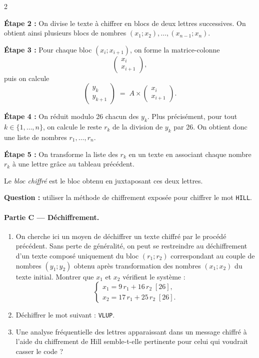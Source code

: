 \documentclass[a4paper,12pt]{article}
\begin{document}
\begin{multicols}{2}
\begin{exercice}[title=Exercice 18 $\star\star\star$ { [Modéliser, Calculer, Chercher] }]{}{}
  \textbf{Étape 2 :} On divise le texte à chiffrer en blocs de deux lettres successives.
  On obtient ainsi plusieurs blocs de nombres $(x_1;x_2),\dots,(x_{n-1};x_n)$.

  \newcolumn
  \textbf{Étape 3 :} Pour chaque bloc $(x_i; x_{i+1})$, on forme la matrice-colonne
  \[
    \begin{pmatrix} x_i \\[4pt] x_{i+1}
    \end{pmatrix},
  \]
  puis on calcule
  \[
    \begin{pmatrix} y_k \\[4pt] y_{k+1}
    \end{pmatrix}
    \;=\;
    A \times
    \begin{pmatrix} x_i \\[3pt] x_{i+1}
    \end{pmatrix}.
  \]

  \textbf{Étape 4 :} On réduit modulo 26 chacun des $y_k$. Plus précisément, pour tout $k \in \{1,\ldots,n\}$, on calcule le reste $r_k$ de la division de $y_k$ par 26. On obtient donc une liste de nombres $r_1,\ldots,r_n$.

  \textbf{Étape 5 :} On transforme la liste des $r_k$ en un texte en associant chaque nombre $r_k$ à une lettre grâce au tableau précédent.

  Le \emph{bloc chiffré} est le bloc obtenu en juxtaposant ces deux lettres.

  \textbf{Question :} utiliser la méthode de chiffrement exposée pour chiffrer le mot \texttt{HILL}.

  \paragraph{Partie C — Déchiffrement.}
  \begin{enumerate}
    \item On cherche ici un moyen de déchiffrer un texte chiffré par le procédé précédent. Sans perte de généralité, on peut se restreindre au déchiffrement d’un texte composé uniquement du bloc $(r_1; r_2)$ correspondant au couple de nombres $(y_1; y_2)$ obtenu après transformation des nombres $(x_1; x_2)$ du texte initial. Montrer que $x_1$ et $x_2$ vérifient le système :
      \[
        \begin{cases}
          x_1 = 9\,r_1 + 16\,r_2 \;[26], \\
          x_2 = 17\,r_1 + 25\,r_2 \;[26].
        \end{cases}
      \]
    \item Déchiffrer le mot suivant : \texttt{VLUP}.
    \item Une analyse fréquentielle des lettres apparaissant dans un message chiffré à l’aide du chiffrement de Hill semble-t-elle pertinente pour celui qui voudrait casser le code ?
  \end{enumerate}
\end{exercice}
\newpage


\end{multicols}
\end{document}
